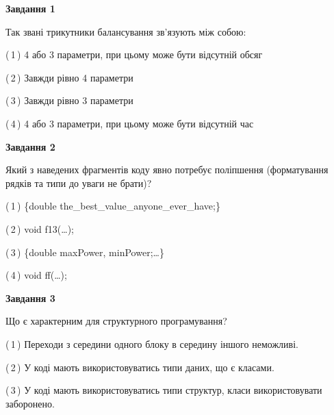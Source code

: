 \documentclass[10pt, ukrainian]{article}
\begin{document}
{
\begin {large}
{\begin {center}\textbf{Завдання 1}\end {center}}\par
Так звані трикутники балансування зв'язують між собою:\par
\vspace{2mm}



(\,1\,) 4 або 3 параметри, при цьому може бути відсутній обсяг %



(\,2\,) Завжди рівно 4 параметри%



(\,3\,) Завжди рівно 3 параметри%



(\,4\,) 4 або 3 параметри, при цьому може бути відсутній час%


{\begin {center}\textbf{Завдання 2}\end {center}}\par
Який з наведених фрагментів коду явно потребує поліпшення (форматування рядків та типи до уваги не брати)?\par
\vspace{2mm}



(\,1\,) \{double the\_best\_value\_anyone\_ever\_have;\} %



(\,2\,) void f13(…);%



(\,3\,) \{double maxPower, minPower;…\} %



(\,4\,) void ff(…);%


{\begin {center}\textbf{Завдання 3}\end {center}}\par
Що є характерним для структурного програмування?\par
\vspace{2mm}



(\,1\,) Переходи з середини одного блоку в середину іншого неможливі. %



(\,2\,) У коді мають використовуватись типи даних, що є класами. %



(\,3\,) У коді мають використовуватись типи структур, класи використовувати заборонено. %




\end{large}}
\end{document}
